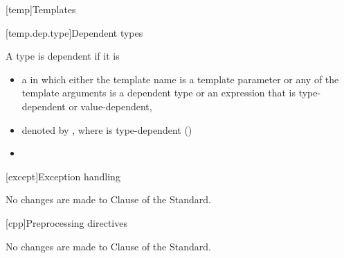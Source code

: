 
[temp]{Templates}

\setcounter{section}{6}
\setcounter{subsection}{2}

[temp.dep.type]{Dependent types}

\begin{std.txt}
A type is dependent if it is \newline
[...]

\begin{itemize}
  \item a  in which either the template name is
  a template parameter or any of the template arguments is a dependent type or
  an expression that is type-dependent or value-dependent, 
  \item denoted by \tcode{)}, where
         is type-dependent ()
  \item {}
\end{itemize}
\end{std.txt}

[except]{Exception handling}

No changes are made to Clause \the\value{chapter} of the \Cpp Standard.

[cpp]{Preprocessing directives}

No changes are made to Clause \the\value{chapter} of the \Cpp Standard.
